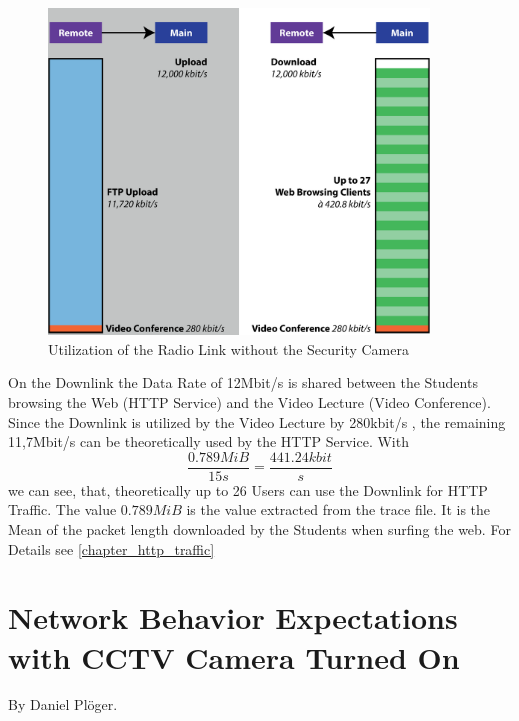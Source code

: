 \documentclass[a4paper,10pt]{book}\usepackage{graphicx}
\begin{document}
\begin{figure}[!ht]
  \begin{center}
    \includegraphics[width=0.9\textwidth]{graphics-02.eps}
    \caption{Utilization of the Radio Link without the Security Camera}
    \label{fig:rLink}
    \end{center}
\end{figure}

On the Downlink the Data Rate of 12Mbit/s is shared between the Students browsing the Web (HTTP Service) and the Video Lecture (Video Conference).
Since the Downlink is utilized by the Video Lecture by 280kbit/s , the remaining 11,7Mbit/s 
can be theoretically used by the HTTP Service. With 
\begin{equation}
 \frac{0.789MiB}{15s}=\frac{441.24kbit}{s}
\end{equation}
we can see, that, theoretically up to 26 Users can use the Downlink for HTTP Traffic.
The value $0.789MiB$ is the value extracted from the trace file. It is the Mean of the packet length downloaded by the Students when surfing the web. For Details see \ref{chapter_http_traffic}

\section{Network Behavior Expectations with CCTV Camera Turned On}
\label{chapter_expectations}
By Daniel Plöger.\\
\end{document}

